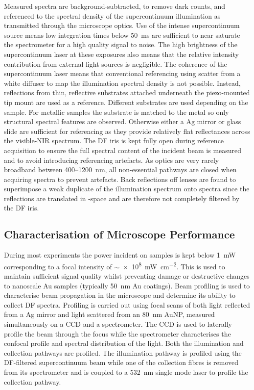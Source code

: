 \documentclass{article}
\begin{document}
Measured spectra are background-subtracted, to remove dark counts, and referenced to the spectral density of the supercontinuum illumination as transmitted through the microscope optics. Use of the intense supercontinuum source means low integration times below \SI{50}{ms} are sufficient to near saturate the spectrometer for a high quality signal to noise. The high brightness of the supercontinuum laser at these exposures also means that the relative intensity contribution from external light sources is negligible.
The coherence of the supercontinuum laser means that conventional referencing using scatter from a white diffuser to map the illumination spectral density is not possible. Instead, reflections from thin, reflective substrates attached underneath the piezo-mounted tip mount are used as a reference. Different substrates are used depending on the sample. For metallic samples the substrate is matched to the metal so only structural spectral features are observed. Otherwise either a Ag mirror or glass slide are sufficient for referencing as they provide relatively flat reflectances across the visible-NIR spectrum. The DF iris is kept fully open during reference acquisition to ensure the full spectral content of the incident beam is measured and to avoid introducing referencing artefacts. As optics are very rarely broadband between 400--\SI{1200}{nm}, all non-essential pathways are closed when acquiring spectra to prevent artefacts. Back reflections off lenses are found to superimpose a weak duplicate of the illumination spectrum onto spectra since the reflections are translated in \wvm-space and are therefore not completely filtered by the DF iris.

\subsection{Characterisation of Microscope Performance}

During most experiments the power incident on samples is kept below \SI{1}{mW} corresponding to a focal intensity of $\sim$\SI{e8}{\milli\watt\per\centi\metre\squared}. This is used to maintain sufficient signal quality whilst preventing damage or destructive changes to nanoscale Au samples (typically \SI{50}{nm} Au coatings). Beam profiling is used to characterise beam propagation in the microscope and determine its ability to collect DF spectra. Profiling is carried out using focal scans of both light reflected from a Ag mirror and light scattered from an \SI{80}{nm} AuNP, measured simultaneously on a CCD and a spectrometer. The CCD is used to laterally profile the beam through the focus while the spectrometer characterises the confocal profile and spectral distribution of the light. Both the illumination and collection pathways are profiled. The illumination pathway is profiled using the DF-filtered supercontinuum beam while one of the collection fibres is removed from its spectrometer and is coupled to a \SI{532}{nm} single mode laser to profile the collection pathway.
\end{document}
